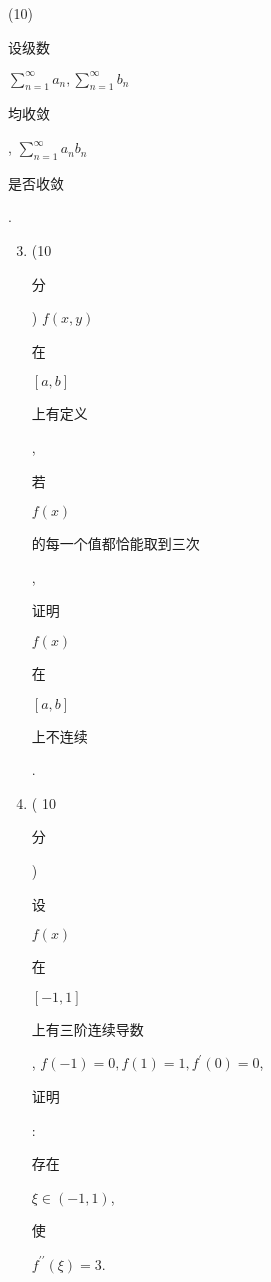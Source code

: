 \documentclass[10pt]{article}
\begin{document}
(10) \begin{CJK}{UTF8}{mj}设级数\end{CJK} $\sum_{n=1}^{\infty} a_{n}, \sum_{n=1}^{\infty} b_{n}$ \begin{CJK}{UTF8}{mj}均收敛\end{CJK}, $\sum_{n=1}^{\infty} a_{n} b_{n}$ \begin{CJK}{UTF8}{mj}是否收敛\end{CJK}.

\begin{enumerate}
  \setcounter{enumi}{2}
  \item (10 \begin{CJK}{UTF8}{mj}分\end{CJK}) $f(x, y)$ \begin{CJK}{UTF8}{mj}在\end{CJK} $[a, b]$ \begin{CJK}{UTF8}{mj}上有定义\end{CJK}, \begin{CJK}{UTF8}{mj}若\end{CJK} $f(x)$ \begin{CJK}{UTF8}{mj}的每一个值都恰能取到三次\end{CJK}, \begin{CJK}{UTF8}{mj}证明\end{CJK} $f(x)$ \begin{CJK}{UTF8}{mj}在\end{CJK} $[a, b]$ \begin{CJK}{UTF8}{mj}上不连续\end{CJK}.

  \item ( 10 \begin{CJK}{UTF8}{mj}分\end{CJK}) \begin{CJK}{UTF8}{mj}设\end{CJK} $f(x)$ \begin{CJK}{UTF8}{mj}在\end{CJK} $[-1,1]$ \begin{CJK}{UTF8}{mj}上有三阶连续导数\end{CJK}, $f(-1)=0, f(1)=1, f^{\prime}(0)=0$, \begin{CJK}{UTF8}{mj}证明\end{CJK}: \begin{CJK}{UTF8}{mj}存在\end{CJK} $\xi \in(-1,1)$, \begin{CJK}{UTF8}{mj}使\end{CJK} $f^{\prime \prime}(\xi)=3$.


\end{enumerate}
\end{document}
